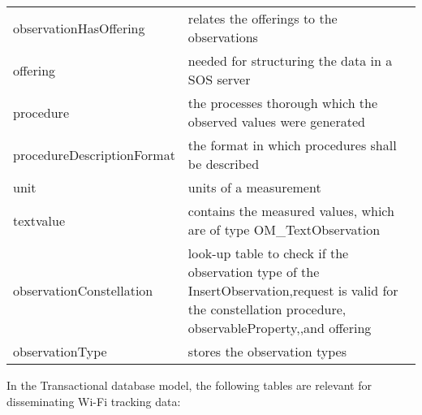 \begin{table}[]
\begin{tabular}{@{}ll@{}}
observationHasOffering     & relates the offerings to the observations                                                                                                                  \\
offering                   & needed for structuring the data in a SOS server                                                                                                            \\
procedure                  & the processes thorough which the observed values were generated                                                                                            \\
procedureDescriptionFormat & the format in which procedures shall be described                                                                                                          \\
unit                       & units of a measurement                                                                                                                                     \\
textvalue                  & contains the measured values, which are of type OM\_TextObservation                                                                                        \\
observationConstellation   & look-up table to check if the observation type of the InsertObservation,request is valid for the constellation procedure, observableProperty,,and offering \\
observationType            & stores the observation types                                                                                                                               \\ \bottomrule
\end{tabular}
\end{table}

In the Transactional database model, the following tables are relevant for disseminating Wi-Fi tracking data:

